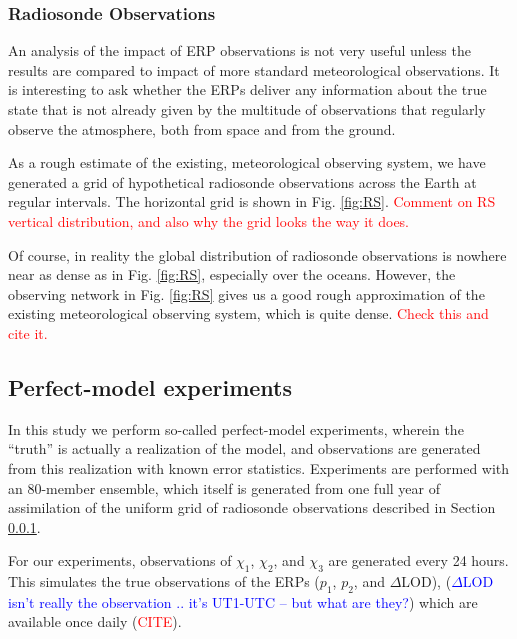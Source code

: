 \documentclass[draft,jgrga]{agutex}
\begin{document}
\begin{article}
\subsubsection{Radiosonde Observations}
\label{sec:radiosondes}
An analysis of the impact of ERP observations is not very useful unless the results are compared to impact of more standard meteorological observations.
It is interesting to ask whether the ERPs deliver any information about the true state that is not already given by the multitude of observations that regularly observe the atmosphere, both from space and from the ground.

As a rough estimate of the existing, meteorological observing system, we have generated a grid of hypothetical radiosonde observations across the Earth at regular intervals.
The horizontal grid is shown in Fig. \ref{fig:RS}.
\textcolor{red}{Comment on RS vertical distribution, and also why the grid looks the way it does.}

Of course, in reality the global distribution of radiosonde observations is nowhere near as dense as in Fig. \ref{fig:RS}, especially over the oceans.
However, the observing network in Fig. \ref{fig:RS} gives us a good rough approximation of the existing meteorological observing system, which is quite dense.
\textcolor{red}{Check this and cite it.}



\subsection{Perfect-model experiments}
\label{sec:experiments}
In this study we  perform so-called perfect-model experiments, wherein the ``truth'' is actually a realization of the model, and observations are generated from this realization with known error statistics.
Experiments are performed with an 80-member ensemble, which itself is generated from one full year of assimilation of the uniform grid of radiosonde observations described in Section \ref{sec:radiosondes}.

For our experiments, observations of $\chi_1$, $\chi_2$, and $\chi_3$ are generated every 24 hours.
This simulates the true observations of the ERPs ($p_1$, $p_2$, and $\Delta$LOD),
(\textcolor{blue}{$\Delta$LOD isn't really the observation .. it's UT1-UTC -- but what are they?})
which are available once daily (\textcolor{red}{CITE}).


\end{article}
\end{document}
